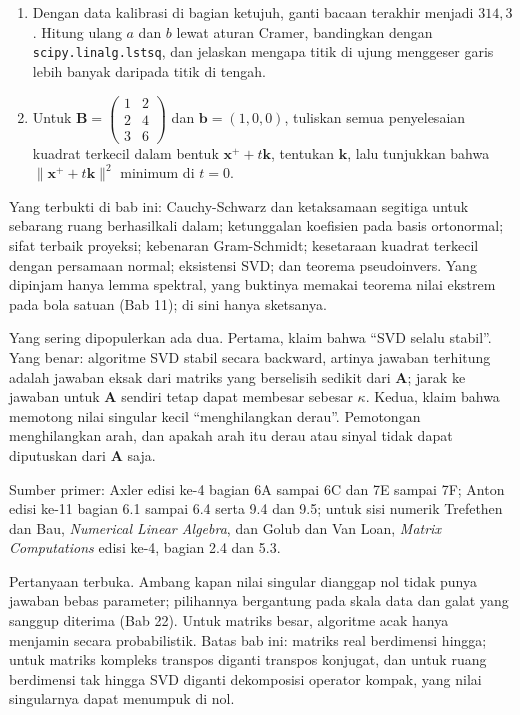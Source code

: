 \begin{latihan}
\begin{enumerate}
  \item Dengan data kalibrasi di bagian ketujuh, ganti bacaan terakhir menjadi
        $314{,}3$. Hitung ulang $a$ dan $b$ lewat aturan Cramer, bandingkan dengan
        \texttt{scipy.linalg.lstsq}, dan jelaskan mengapa titik di ujung menggeser garis
        lebih banyak daripada titik di tengah.

  \item Untuk $\mathbf{B}=\begin{pmatrix}1&2\\ 2&4\\ 3&6\end{pmatrix}$ dan
        $\mathbf{b}=(1,0,0)$, tuliskan semua penyelesaian kuadrat terkecil dalam bentuk
        $\mathbf{x}^{+}+t\mathbf{k}$, tentukan $\mathbf{k}$, lalu tunjukkan bahwa
        $\|\mathbf{x}^{+}+t\mathbf{k}\|^{2}$ minimum di $t=0$.
\end{enumerate}
\end{latihan}

\begin{untukpeneliti}
Yang terbukti di bab ini: Cauchy-Schwarz dan ketaksamaan segitiga untuk sebarang ruang
berhasilkali dalam; ketunggalan koefisien pada basis ortonormal; sifat terbaik proyeksi;
kebenaran Gram-Schmidt; kesetaraan kuadrat terkecil dengan persamaan normal; eksistensi
SVD; dan teorema pseudoinvers. Yang dipinjam hanya lemma spektral, yang buktinya memakai
teorema nilai ekstrem pada bola satuan (Bab 11); di sini hanya sketsanya.

Yang sering dipopulerkan ada dua. Pertama, klaim bahwa ``SVD selalu stabil''. Yang benar:
algoritme SVD stabil secara backward, artinya jawaban terhitung adalah jawaban eksak dari
matriks yang berselisih sedikit dari $\mathbf{A}$; jarak ke jawaban untuk $\mathbf{A}$
sendiri tetap dapat membesar sebesar $\kappa$. Kedua, klaim bahwa memotong nilai singular
kecil ``menghilangkan derau''. Pemotongan menghilangkan arah, dan apakah arah itu derau
atau sinyal tidak dapat diputuskan dari $\mathbf{A}$ saja.

Sumber primer: Axler edisi ke-4 bagian 6A sampai 6C dan 7E sampai 7F; Anton edisi ke-11
bagian 6.1 sampai 6.4 serta 9.4 dan 9.5; untuk sisi numerik Trefethen dan Bau,
\emph{Numerical Linear Algebra}, dan Golub dan Van Loan, \emph{Matrix Computations}
edisi ke-4, bagian 2.4 dan 5.3.

Pertanyaan terbuka. Ambang kapan nilai singular dianggap nol tidak punya jawaban bebas
parameter; pilihannya bergantung pada skala data dan galat yang sanggup diterima (Bab 22).
Untuk matriks besar, algoritme acak hanya menjamin secara probabilistik. Batas bab ini:
matriks real berdimensi hingga; untuk matriks kompleks transpos diganti transpos konjugat,
dan untuk ruang berdimensi tak hingga SVD diganti dekomposisi operator kompak, yang nilai
singularnya dapat menumpuk di nol.
\end{untukpeneliti}

